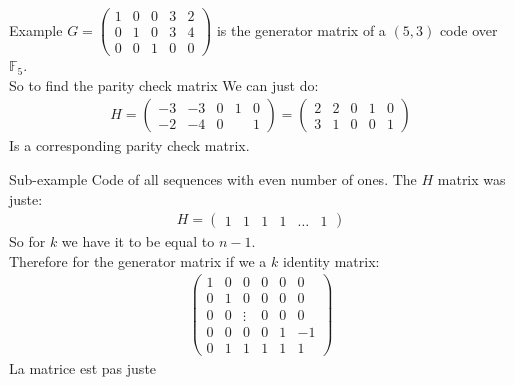     \begin{parag}{Example}
        $G =  \begin{pmatrix}1  & 0 & 0 & 3 & 2 \\ 0 & 1 & 0 & 3 & 4 \\ 0 & 0 & 1 & 0 & 0 \end{pmatrix} $ is the generator matrix of a $\left(5, 3\right)$ code over $\mathbb{F}_5$.\\
So to find the parity check matrix We can just do:
        \begin{align*} H = \begin{pmatrix} -3 & -3 & 0 & 1 & 0 \\ -2 & -4 & 0 &  & 1 \end{pmatrix} =  \begin{pmatrix} 2 & 2 & 0 & 1 & 0 \\ 3 & 1 & 0 & 0 & 1 \end{pmatrix}  \end{align*}
        Is a corresponding parity check matrix.
        \begin{subparag}{Sub-example}
            Code of all sequences with even number of ones. The $H$ matrix was juste:
            \begin{align*} H = \begin{pmatrix} 1 & 1 & 1 & 1 & \ldots & 1 \end{pmatrix}  \end{align*}
            So for $k$ we have it to be equal to $n - 1$.\\
            Therefore for the generator matrix if we a $k$ identity matrix:
            \begin{align*} 
                \begin{pmatrix} 1 & 0 & 0 &0  & 0 & 0 \\ 0 & 1 & 0 & 0 & 0 & 0 \\ 0 & 0 & \vdots & 0 & 0 & 0 \\ 0 & 0 & 0 & 0  & 1 & -1 \\ 0 & 1 & 1  & 1 & 1 & 1 \end{pmatrix} 
            \end{align*}
            La matrice est pas juste
        \end{subparag}
    \end{parag}
